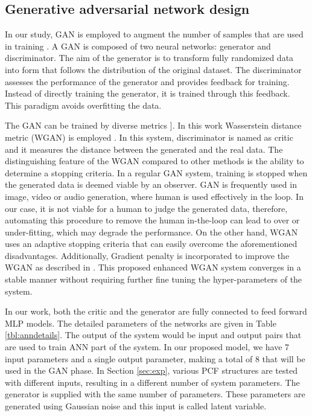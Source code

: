 \documentclass[journal]{IEEEtran}
\begin{document}
\subsection{Generative adversarial network design}
\label{ssec:gan}
In our study, GAN is employed to augment the number of samples that are used in training  \cite{goodfellow2014generative}. A GAN is composed of two neural networks: generator and discriminator. The aim of the generator is to transform fully randomized data into form that follows the distribution of the original dataset. The discriminator assesses the performance of the generator and provides feedback for training. Instead of directly training the generator, it is trained through this feedback. This paradigm avoids overfitting the data.

The GAN can be trained by diverse metrics \cite{goodfellow2014generative, mao2017least, lucic2018gans}]. In this work Wasserstein distance metric (WGAN) is employed \cite{arjovsky2017wasserstein}. In this system, discriminator is named as critic and it measures the distance between the generated and the real data. The distinguishing feature of the WGAN compared to other methods is the ability to determine a stopping criteria. In a regular GAN system, training is stopped when the generated data is deemed viable by an observer. GAN is frequently used in image, video or audio generation, where human is used effectively in the loop. In our case, it is not viable for a human to judge the generated data, therefore, automating this procedure to remove the human in-the-loop can lead to over or under-fitting, which may degrade the performance. On the other hand, WGAN uses an adaptive stopping criteria that can easily overcome the aforementioned disadvantages. Additionally, Gradient penalty is incorporated to improve the WGAN as described in \cite{gulrajani2017improved}. This proposed enhanced WGAN system converges in a stable manner without requiring further fine tuning the hyper-parameters of the system. %

In our work, both the critic and the generator are fully connected to feed forward MLP models. The detailed parameters of the networks are given in Table \ref{tbl:anndetails}. The output of the system would be input and output pairs that are used to train ANN part of the system. In our proposed model, we have 7 input parameters and a single output parameter, making a total of 8 that will be used in the GAN phase. In Section  \ref{sec:exp}, various PCF structures are tested with different inputs, resulting in a different number of system parameters. The generator is supplied with the same number of parameters. These parameters are generated using Gaussian noise and this input is called latent variable.
\end{document}
